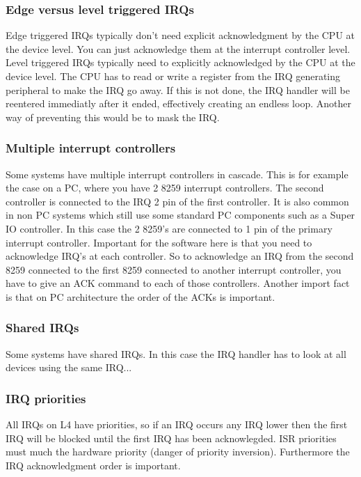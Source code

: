 \subsubsection{Edge versus level triggered IRQs}

Edge triggered IRQs typically don't need explicit acknowledgment by
the CPU at the device level. You can just acknowledge them at the
interrupt controller level.  Level triggered IRQs typically need to
explicitly acknowledged by the CPU at the device level. The CPU has to
read or write a register from the IRQ generating peripheral to make
the IRQ go away. If this is not done, the IRQ handler will be
reentered immediatly after it ended, effectively creating an endless
loop. Another way of preventing this would be to mask the IRQ.

\subsubsection{Multiple interrupt controllers}

Some systems have multiple interrupt controllers in cascade. This is
for example the case on a PC, where you have 2 8259 interrupt
controllers. The second controller is connected to the IRQ 2 pin of
the first controller. It is also common in non PC systems which still
use some standard PC components such as a Super IO controller. In this
case the 2 8259's are connected to 1 pin of the primary interrupt
controller. Important for the software here is that you need to
acknowledge IRQ's at each controller. So to acknowledge an IRQ from
the second 8259 connected to the first 8259 connected to another
interrupt controller, you have to give an ACK command to each of those
controllers.  Another import fact is that on PC architecture the order
of the ACKs is important.

\subsubsection{Shared IRQs}

Some systems have shared IRQs. In this case the IRQ handler has to
look at all devices using the same IRQ...

\subsubsection{IRQ priorities}

All IRQs on L4 have priorities, so if an IRQ occurs any IRQ lower then
the first IRQ will be blocked until the first IRQ has been
acknowlegded.  ISR priorities must much the hardware priority (danger
of priority inversion).  Furthermore the IRQ acknowledgment order is
important.

